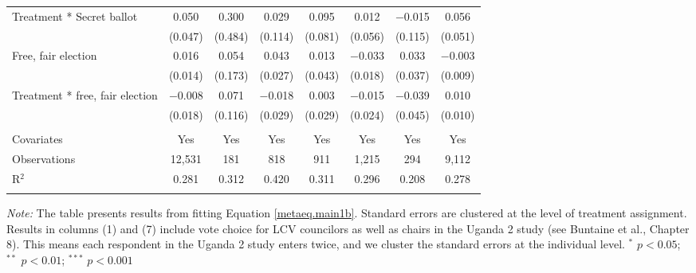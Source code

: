 \begin{table}[H]
{\begin{tabular}{@{\extracolsep{1pt}}lccccccc}
  Treatment * Secret ballot & 0.050 & 0.300 & 0.029 & 0.095 & 0.012 & $-$0.015 & 0.056 \\ 
  & (0.047) & (0.484) & (0.114) & (0.081) & (0.056) & (0.115) & (0.051) \\ 
  Free, fair election & 0.016 & 0.054 & 0.043 & 0.013 & $-$0.033 & 0.033 & $-$0.003 \\ 
  & (0.014) & (0.173) & (0.027) & (0.043) & (0.018) & (0.037) & (0.009) \\ 
  Treatment * free, fair election & $-$0.008 & 0.071 & $-$0.018 & 0.003 & $-$0.015 & $-$0.039 & 0.010 \\ 
  & (0.018) & (0.116) & (0.029) & (0.029) & (0.024) & (0.045) & (0.010) \\ 
 \hline \\[-1.8ex] 
Covariates & Yes & Yes & Yes & Yes & Yes & Yes & Yes \\ 
Observations & 12,531 & 181 & 818 & 911 & 1,215 & 294 & 9,112 \\ 
R$^{2}$ & 0.281 & 0.312 & 0.420 & 0.311 & 0.296 & 0.208 & 0.278 \\ 
\hline 
\hline \\[-1.8ex] 
\end{tabular}}
\begin{flushleft} \hspace{1cm} \scriptsize{{\textit{Note:}  The table presents results from fitting Equation \ref{metaeq.main1b}. Standard errors are clustered at the level of treatment assignment. Results in columns (1) and (7) include vote choice for LCV councilors as well as chairs in the Uganda 2 study (see Buntaine et al., Chapter 8). This means each respondent in the Uganda 2 study enters twice, and we cluster the standard errors at the individual level. $^{*}$ $p<0.05$; $^{**}$ $p<0.01$; $^{***}$ $p<0.001$ }} \end{flushleft} \end{table}
